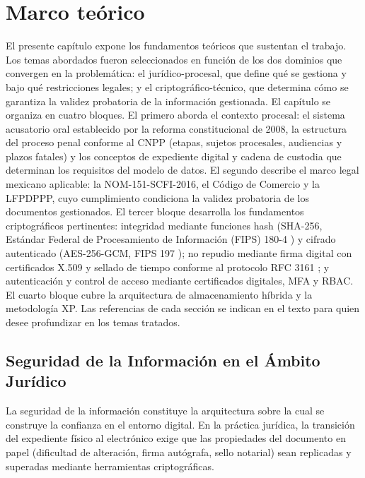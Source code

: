 \chapter{Marco teórico}\label{cap:marco}

El presente capítulo expone los fundamentos teóricos que sustentan el trabajo. Los temas abordados fueron seleccionados en función de los dos dominios que convergen en la problemática: el jurídico-procesal, que define qué se gestiona y bajo qué restricciones legales; y el criptográfico-técnico, que determina cómo se garantiza la validez probatoria de la información gestionada. El capítulo se organiza en cuatro bloques. El primero aborda el contexto procesal: el sistema acusatorio oral establecido por la reforma constitucional de 2008, la estructura del proceso penal conforme al CNPP (etapas, sujetos procesales, audiencias y plazos fatales) y los conceptos de expediente digital y cadena de custodia que determinan los requisitos del modelo de datos. El segundo describe el marco legal mexicano aplicable: la NOM-151-SCFI-2016, el Código de Comercio y la LFPDPPP, cuyo cumplimiento condiciona la validez probatoria de los documentos gestionados. El tercer bloque desarrolla los fundamentos criptográficos pertinentes: integridad mediante funciones hash (SHA-256, Estándar Federal de Procesamiento de Información (FIPS) 180-4 \cite{nist2015fips1804}) y cifrado autenticado (AES-256-GCM, FIPS 197 \cite{nist2001fips197}); no repudio mediante firma digital con certificados X.509 y sellado de tiempo conforme al protocolo RFC 3161 \cite{adams2001}; y autenticación y control de acceso mediante certificados digitales, MFA y RBAC. El cuarto bloque cubre la arquitectura de almacenamiento híbrida y la metodología XP. Las referencias de cada sección se indican en el texto para quien desee profundizar en los temas tratados.

\section{Seguridad de la Información en el Ámbito Jurídico}\label{sec:seguridad-juridica}

La seguridad de la información constituye la arquitectura sobre la cual se construye la confianza en el entorno digital. En la práctica jurídica, la transición del expediente físico al electrónico exige que las propiedades del documento en papel (dificultad de alteración, firma autógrafa, sello notarial) sean replicadas y superadas mediante herramientas criptográficas.

